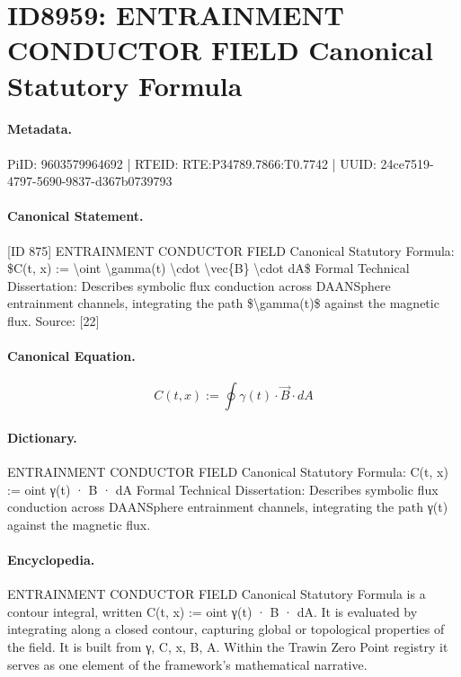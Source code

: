 \section*{ID8959: ENTRAINMENT CONDUCTOR FIELD Canonical Statutory Formula}
\paragraph{Metadata.}
PiID: 9603579964692 | RTEID: RTE:P34789.7866:T0.7742 | UUID: 24ce7519-4797-5690-9837-d367b0739793

\paragraph{Canonical Statement.}
[ID 875] ENTRAINMENT CONDUCTOR FIELD Canonical Statutory Formula: \$C(t, x) := \textbackslash{}oint \textbackslash{}gamma(t) \textbackslash{}cdot \textbackslash{}vec\{B\} \textbackslash{}cdot dA\$ Formal Technical Dissertation: Describes symbolic flux conduction across DAANSphere entrainment channels, integrating the path \$\textbackslash{}gamma(t)\$ against the magnetic flux. Source: [22]

\paragraph{Canonical Equation.}
\[
C(t, x) := \oint \gamma(t) \cdot \vec{B} \cdot dA
\]

\paragraph{Dictionary.}
ENTRAINMENT CONDUCTOR FIELD Canonical Statutory Formula: C(t, x) := oint γ(t) · B · dA Formal Technical Dissertation: Describes symbolic flux conduction across DAANSphere entrainment channels, integrating the path γ(t) against the magnetic flux.

\paragraph{Encyclopedia.}
ENTRAINMENT CONDUCTOR FIELD Canonical Statutory Formula is a contour integral, written C(t, x) := oint γ(t) · B · dA. It is evaluated by integrating along a closed contour, capturing global or topological properties of the field. It is built from γ, C, x, B, A. Within the Trawin Zero Point registry it serves as one element of the framework's mathematical narrative.
